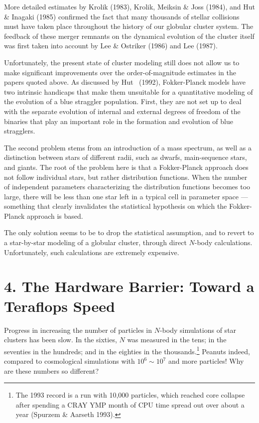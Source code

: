More detailed estimates by Krolik (1983), Krolik, Meiksin 
\& Joss (1984), and Hut \& Inagaki (1985) confirmed the fact that
many thousands of stellar collisions must have taken place throughout
the history of our globular cluster system.  The feedback of these
merger remnants on the dynamical evolution of the cluster itself was
first taken into account by Lee \& Ostriker (1986) and Lee (1987).  
 
Unfortunately, the present state of cluster modeling still does not
allow us to make significant improvements over the order-of-magnitude
estimates in the papers quoted above.  As discussed by Hut
\etal\ (1992), Fokker-Planck models have two intrinsic handicaps that make
them unsuitable for a quantitative modeling of the evolution of a blue
straggler population.  First, they are not set up to deal with the
separate evolution of internal and external degrees of freedom of the
binaries that play an important role in the formation and evolution of
blue stragglers.

The second problem stems from an introduction of a mass spectrum, as
well as a distinction between stars of different radii, such as
dwarfs, main-sequence stars, and giants.  The root of the problem here
is that a Fokker-Planck approach does not follow individual stars, but
rather distribution functions.  When the number of independent
parameters characterizing the distribution functions becomes too large,
there will be less than one star left in a typical cell in parameter
space --- something that clearly invalidates the statistical
hypothesis on which the Fokker-Planck approach is based.

The only solution seems to be to drop the statistical assumption, and
to revert to a star-by-star modeling of a globular cluster, through
direct $N$-body calculations.  Unfortunately, such calculations are
extremely expensive.

\section{4. The Hardware Barrier: Toward a Teraflops Speed}

Progress in increasing the number of particles in $N$-body simulations
of star clusters has been slow.  In the sixties, $N$ was measured in
the tens; in the seventies in the hundreds; and in the eighties in the
thousands.\footnote
{The 1993 record is a run with 10,000 particles, which reached core
collapse after spending a CRAY YMP month of CPU time spread out over
about a year (Spurzem \& Aarseth 1993).}
Peanuts indeed, compared to cosmological simulations with $10^6 \sim
10^7$ and more particles!  Why are these numbers so different?

